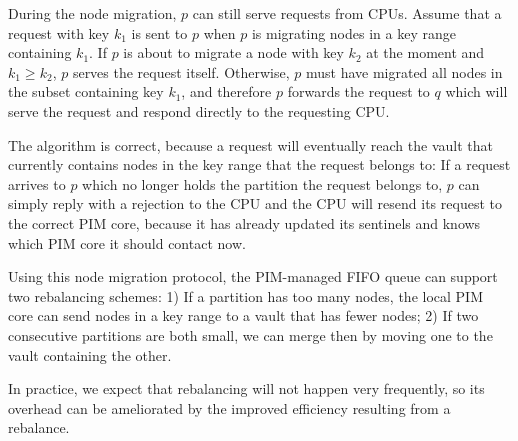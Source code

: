 During the node migration, $p$ can still serve requests from CPUs.
Assume that a request with key $k_1$ is sent to $p$ when $p$ is migrating nodes 
in a key range containing $k_1$.  
If $p$ is about to migrate a node with key $k_2$ at the moment and $k_1 \ge k_2$, 
$p$ serves the request itself. 
Otherwise, $p$ must have migrated all nodes in the subset containing key $k_1$, and therefore $p$ 
forwards the request to $q$ which will serve the request and respond directly to the requesting CPU. 

The algorithm is correct, because a request will eventually reach the vault that 
currently contains nodes in the key range that the request belongs to: 
If a request arrives to $p$ which no longer holds the partition the request belongs to, 
$p$ can simply reply with a rejection to the CPU and the CPU will resend its request to 
the correct PIM core, 
because it has already updated its sentinels and knows which PIM core it should contact now. 

Using this node migration protocol, the PIM-managed FIFO queue can support two rebalancing schemes:
1) If a partition has too many nodes, the local PIM core can send nodes in a key range to a vault 
that has fewer nodes;
2) If two consecutive partitions are both small, 
we can merge then by moving one to the vault containing the other. 

In practice, we expect that rebalancing will not happen very frequently, so its overhead can be 
ameliorated by the improved efficiency resulting from a rebalance. 

